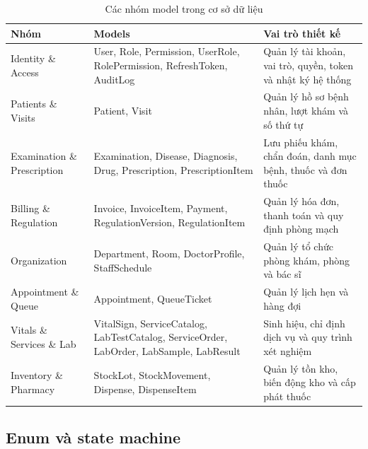 \begin{longtable}{|p{3.3cm}|p{5.5cm}|p{5.4cm}|}
\caption{Các nhóm model trong cơ sở dữ liệu}\\
\hline
\textbf{Nhóm} & \textbf{Models} & \textbf{Vai trò thiết kế} \\
\hline
Identity \& Access & User, Role, Permission, UserRole, RolePermission, RefreshToken, AuditLog & Quản lý tài khoản, vai trò, quyền, token và nhật ký hệ thống \\
\hline
Patients \& Visits & Patient, Visit & Quản lý hồ sơ bệnh nhân, lượt khám và số thứ tự \\
\hline
Examination \& Prescription & Examination, Disease, Diagnosis, Drug, Prescription, PrescriptionItem & Lưu phiếu khám, chẩn đoán, danh mục bệnh, thuốc và đơn thuốc \\
\hline
Billing \& Regulation & Invoice, InvoiceItem, Payment, RegulationVersion, RegulationItem & Quản lý hóa đơn, thanh toán và quy định phòng mạch \\
\hline
Organization & Department, Room, DoctorProfile, StaffSchedule & Quản lý tổ chức phòng khám, phòng và bác sĩ \\
\hline
Appointment \& Queue & Appointment, QueueTicket & Quản lý lịch hẹn và hàng đợi \\
\hline
Vitals \& Services \& Lab & VitalSign, ServiceCatalog, LabTestCatalog, ServiceOrder, LabOrder, LabSample, LabResult & Sinh hiệu, chỉ định dịch vụ và quy trình xét nghiệm \\
\hline
Inventory \& Pharmacy & StockLot, StockMovement, Dispense, DispenseItem & Quản lý tồn kho, biến động kho và cấp phát thuốc \\
\hline
\end{longtable}

\subsection{Enum và state machine}

